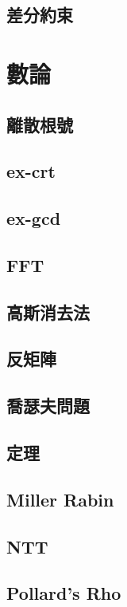 \documentclass[a4paper,10pt,twocolumn,oneside]{article}
\begin{document}
\subsection{差分約束}

\section{數論}
\subsection{離散根號}

\subsection{ex-crt}

\subsection{ex-gcd}

\subsection{FFT}

\subsection{高斯消去法}

\subsection{反矩陣}

\subsection{喬瑟夫問題}

\subsection{定理}

\subsection{Miller Rabin}

\subsection{NTT}

\subsection{Pollard's Rho}

\end{document}
